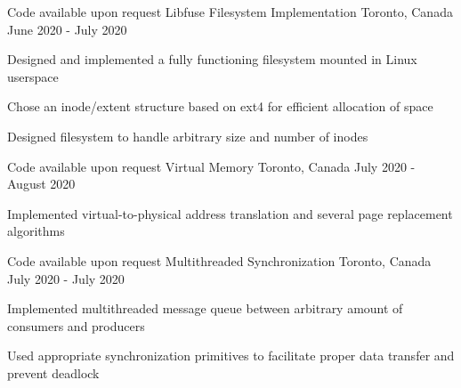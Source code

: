 

\begin{cventries}

  \cventry
  {Code available upon request} %
  {Libfuse Filesystem Implementation} %
  {Toronto, Canada} %
  {June 2020 - July 2020} %
  {
    \begin{cvitems} %
      \item {Designed and implemented a fully functioning filesystem mounted in Linux userspace}
      \item {Chose an inode/extent structure based on ext4 for efficient allocation of space}
      \item {Designed filesystem to handle arbitrary size and number of inodes}
    \end{cvitems}
  }

  \cventry
  {Code available upon request} %
  {Virtual Memory} %
  {Toronto, Canada} %
  {July 2020 - August 2020} %
  {
    \begin{cvitems} %
      \item {Implemented virtual-to-physical address translation and several page replacement algorithms}
    \end{cvitems}
  }

  \cventry
  {Code available upon request} %
  {Multithreaded Synchronization} %
  {Toronto, Canada} %
  {July 2020 - July 2020} %
  {
    \begin{cvitems} %
      \item {Implemented multithreaded message queue between arbitrary amount of consumers and producers }
      \item {Used appropriate synchronization primitives to facilitate proper data transfer and prevent deadlock}
    \end{cvitems}
  }


\end{cventries}
